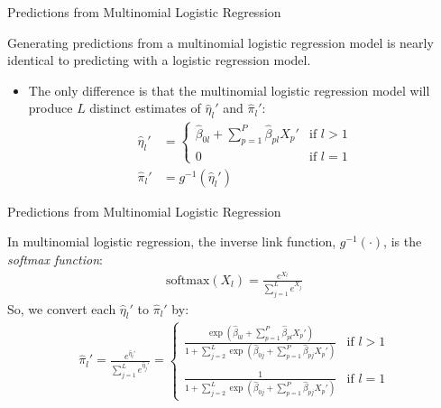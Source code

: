 \documentclass{beamer}\usepackage[]{graphicx}\usepackage[]{color}
\begin{document}

\begin{frame}{Predictions from Multinomial Logistic Regression}
  
  Generating predictions from a multinomial logistic regression model is nearly 
  identical to predicting with a logistic regression model.
  \vb
  \begin{itemize}
  \item The only difference is that the multinomial logistic regression model 
    will produce $L$ distinct estimates of $\hat{\eta}_l'$ and $\hat{\pi}_l'$:
    \begin{align*}
      \hat{\eta}_l' &= 
      \begin{cases}
        \hat{\beta}_{0l} + \sum_{p = 1}^P \hat{\beta}_{pl} X_p' & \text{if $l > 1$}\\
        0 & \text{if $l = 1$}
      \end{cases}\\[8pt]
      \hat{\pi}_l' &= g^{-1}(\hat{\eta}_l')
    \end{align*}
  \end{itemize}
  
\end{frame}


\begin{frame}{Predictions from Multinomial Logistic Regression}
  
  In multinomial logistic regression, the inverse link function, $g^{-1}(\cdot)$, 
  is the \emph{softmax function}:
  \begin{align*}
    \text{softmax}(X_l) = \frac{e^{X_l}}{\sum_{j = 1}^Le^{X_j}}
  \end{align*}
  So, we convert each $\hat{\eta}_l'$ to $\hat{\pi}_l'$ by:
  \begin{align*}
    \hat{\pi}_l' = \frac{e^{\hat{\eta}_l'}}{\sum_{j = 1}^L e^{\hat{\eta}_j'}} = 
    \begin{cases}
      \frac{\exp \left( 
        \hat{\beta}_{0l} + \sum_{p = 1}^P \hat{\beta}_{pl} X_p' \right) }
           {1 + \sum_{j = 2}^L \exp \left(
             \hat{\beta}_{0j} + \sum_{p = 1}^P \hat{\beta}_{pj} X_p' 
             \right) } & \text{if $l > 1$}\\
           \\
           \frac{1}
                {1 + \sum_{j = 2}^L \exp \left(
                  \hat{\beta}_{0j} + \sum_{p = 1}^P \hat{\beta}_{pj} X_p' 
                  \right) } & \text{if $l = 1$}
    \end{cases}
  \end{align*}
           
\end{frame}
\end{document}

